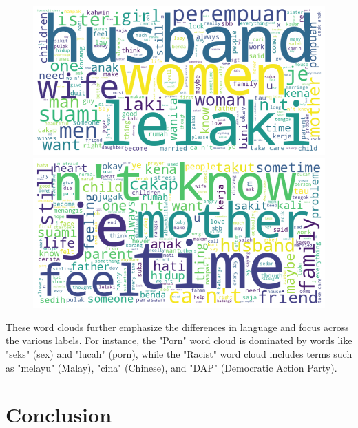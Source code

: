 \documentclass[preprint]{article}
\begin{document}
\begin{figure}[h]
  \centering
  \begin{minipage}[b]{0.45\textwidth}
    \centering
    \includegraphics[width=\linewidth]{img/sexist-wordcloud.png}
  \end{minipage}
  \hfill
  \begin{minipage}[b]{0.45\textwidth}
    \centering
    \includegraphics[width=\linewidth]{img/mental-wordcloud.png}
  \end{minipage}
\end{figure}

\newpage

These word clouds further emphasize the differences in language and focus across the various labels. For instance, the "Porn" word cloud is dominated by words like "seks" (sex) and "lucah" (porn), while the "Racist" word cloud includes terms such as "melayu" (Malay), "cina" (Chinese), and "DAP" (Democratic Action Party).

\section{Conclusion}
\end{document}
